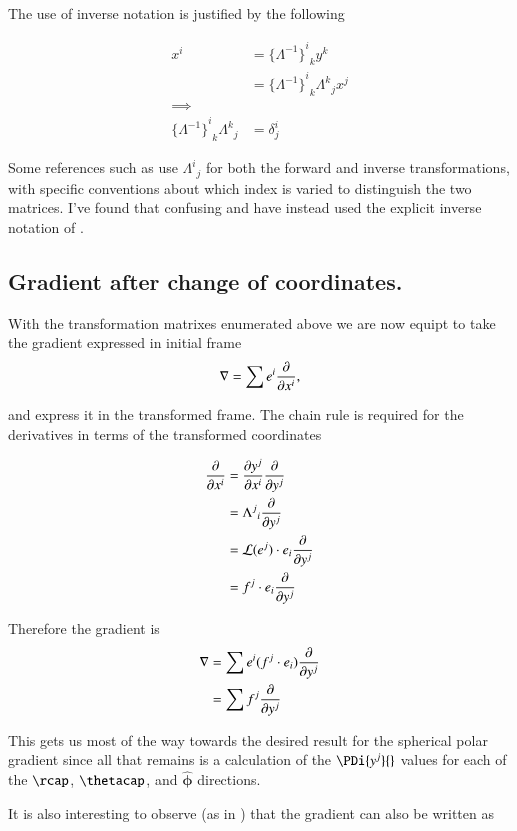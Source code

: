 \documentclass{article}
\newcommand{\phicap}[0]{\hat{\boldsymbol{\phi}}}
\newcommand{\Lor}[2]{{{\Lambda^{#1}}_{#2}}}
\newcommand{\ILor}[2]{{{ \{{\Lambda^{-1}\} }^{#1}}_{#2}}}
\begin{document}
The use of inverse notation is justified by the following

\begin{align*}
x^i &= \ILor{i}{k} y^k \\
&= \ILor{i}{k} \Lor{k}{j} x^j \\
\implies \\
\ILor{i}{k} \Lor{k}{j} &= \delta^i_j
\end{align*}

Some references such as \cite{MinahanTensors} use $\Lor{i}{j}$ for both the forward and inverse transformations, with specific conventions
about which index is varied to distinguish the two matrices.  I've found that confusing and have instead used the explicit inverse notation
of \cite{SpenceTensors}.

\subsection{ Gradient after change of coordinates. }

With the transformation matrixes enumerated above we are now equipt to take the gradient expressed in initial frame
\begin{align*}
\nabla = \sum e^i \frac{\partial {}}{\partial {x^i}},
\end{align*}

and express it in the transformed frame.  The chain rule is required for the derivatives in terms of the transformed coordinates

\begin{align*}
\PD{x^i}{} 
&= \PD{x^i}{y^j} \PD{y^j}{} \\
&= \Lor{j}{i} \PD{y^j}{} \\
&= \LL(e^j) \cdot e_i \PD{y^j}{} \\
&= f^j \cdot e_i \PD{y^j}{}
\end{align*}

Therefore the gradient is
\begin{align*}
\nabla &= \sum e^i (f^j \cdot e_i) \frac{\partial {}}{\partial {y^j}} \\
      &= \sum f^j \frac{\partial {}}{\partial {y^j}} \\
\end{align*}

This gets us most of the way towards the desired result for the spherical polar gradient since all that remains is a calculation of the $\PDi{y^j}{}$
values for
each of the $\rcap$, $\thetacap$, and $\phicap$ directions.

It is also interesting to observe (as in \cite{DenkerMaxwell}) that the gradient can also be written as
\end{document}
